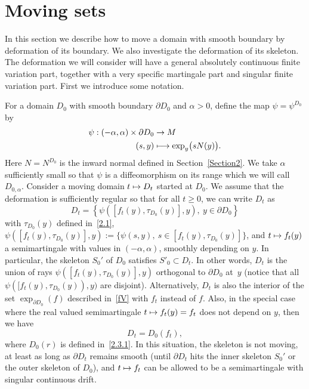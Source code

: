 \documentclass[10pt]{amsart}
\newcommand\mto{\mathchoice{\longmapsto}{\mapsto}{\mapsto}{\mapsto}}
\theoremstyle{plain}
\theoremstyle{definition}
\let\a\alpha
\let\pa\partial
\begin{document}
\section{Moving sets}
\label{Section3}

In this section we describe how to move a domain with smooth boundary by defor\-mation of its boundary. We also investigate the deformation of its skeleton. The deformation we will consider will have a general absolutely continuous finite variation part, together with a very specific martingale part and singular finite variation part. First we introduce some notation.

For a domain $D_0$ with smooth boundary $\partial D_0$ and $\a>0$, define the map $\psi=\psi^{D_0}$ by
\begin{equation}
\begin{split}
\psi: (-\a,\a)\times \partial D_0&\to M\\
(s, y)&\mto \exp_y\bigl(sN(y)\bigr).
\end{split}
\end{equation}
Here $N=N^{D_0}$ is the inward normal defined in Section~\ref{Section2}. We take $\a$ sufficiently small so that $\psi$ is a diffeomorphism on its range which we will call $D_{0,\a}$.
Consider a moving domain $t\mto D_t$ started at $D_0$.
We assume that the deformation is sufficiently regular so that
for all $t\ge 0$, we can write $D_t$ as
\begin{equation}
D_t=\left\{\psi([f_t(y),\tau_{D_0}(y)],y),\ y\in \partial D_0\right\}
\end{equation}
with $\tau_{D_0}(y)$ defined in~\eqref{2.1},
$\psi([f_t(y),\tau_{D_0}(y)],y):=\{\psi(s,y),\ s \in [f_t(y),\tau_{D_0}(y)]\}$,
and
$t\mto f_t(y)$ a semimartingale with values in $(-\a,\a)$, smoothly depending on $y$.
{In particular, the skeleton $S_0'$ of $D_0$ satisfies $S'_0\subset D_t$.}
In other words, $D_t$ is the union of rays $\psi([f_t(y),\tau_{D_0}(y)],y)$ orthogonal to $\partial D_0$ at~$y$ (notice that all $\psi([f_t(y),\tau_{D_0}(y)),y)$ are disjoint). Alternatively, $D_t$ is also the interior of the set $\exp_{\partial D_0} (f)$ described in~\eqref{fV} with $f_t$ instead of $f$.
Also, in the special case where the real valued semimartingale $t\mto f_t(y)=f_t$ does not depend on $y$, then we have
\begin{equation}
\label{3.3}
D_t=D_0(f_t),
\end{equation}
where $D_0(r)$ is defined in~\eqref{2.3.1}. In this situation, the skeleton is not moving, at least as long as $\pa D_t$ remains smooth {(\ie until $\pa D_t$ hits the inner skeleton $S_0'$ {or the outer skeleton of $D_0$}),} and $t\mto f_t$ can be allowed to be a semimartingale with singular continuous drift.
\end{document}
